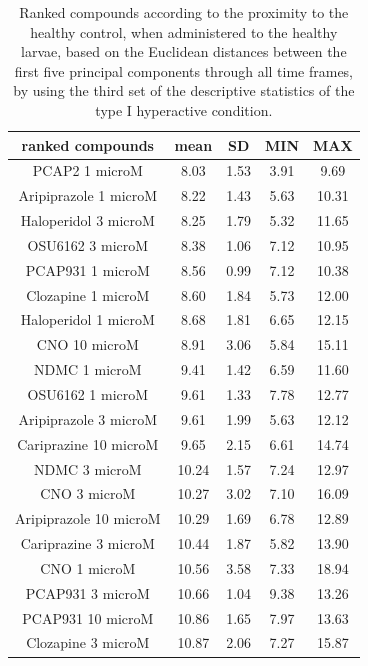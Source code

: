 \begin{table}[h!]\tiny
\centering
\caption{Ranked compounds according to the proximity to the healthy control, when administered to the healthy larvae, based on the Euclidean distances between the first five principal components through all time frames, by using the third set of the descriptive statistics of the type I hyperactive condition.}
\begin{tabular}{|c|c|c|c|c|}
\hline
ranked compounds             & mean & SD   & MIN  & MAX   \\ \hline
PCAP2 1 microM         & 8.03  & 1.53 & 3.91  & 9.69  \\ \hline
Aripiprazole 1 microM  & 8.22  & 1.43 & 5.63  & 10.31 \\ \hline
Haloperidol 3 microM   & 8.25  & 1.79 & 5.32  & 11.65 \\ \hline
OSU6162 3 microM       & 8.38  & 1.06 & 7.12  & 10.95 \\ \hline
PCAP931 1 microM       & 8.56  & 0.99 & 7.12  & 10.38 \\ \hline
Clozapine 1 microM     & 8.60   & 1.84 & 5.73  & 12.00    \\ \hline
Haloperidol 1 microM   & 8.68  & 1.81 & 6.65  & 12.15 \\ \hline
CNO 10 microM          & 8.91  & 3.06 & 5.84  & 15.11 \\ \hline
NDMC 1 microM          & 9.41  & 1.42 & 6.59  & 11.60  \\ \hline
OSU6162 1 microM       & 9.61  & 1.33 & 7.78  & 12.77 \\ \hline
Aripiprazole 3 microM  & 9.61  & 1.99 & 5.63  & 12.12 \\ \hline
Cariprazine 10 microM  & 9.65  & 2.15 & 6.61  & 14.74 \\ \hline
NDMC 3 microM          & 10.24 & 1.57 & 7.24  & 12.97 \\ \hline
CNO 3 microM           & 10.27 & 3.02 & 7.10   & 16.09 \\ \hline
Aripiprazole 10 microM & 10.29 & 1.69 & 6.78  & 12.89 \\ \hline 
Cariprazine 3 microM   & 10.44 & 1.87 & 5.82  & 13.90  \\ \hline
CNO 1 microM           & 10.56 & 3.58 & 7.33  & 18.94 \\ \hline
PCAP931 3 microM       & 10.66 & 1.04 & 9.38  & 13.26 \\ \hline
PCAP931 10 microM      & 10.86 & 1.65 & 7.97  & 13.63 \\ \hline
Clozapine 3 microM     & 10.87 & 2.06 & 7.27  & 15.87 \\ \hline

\end{tabular}
\end{table}
